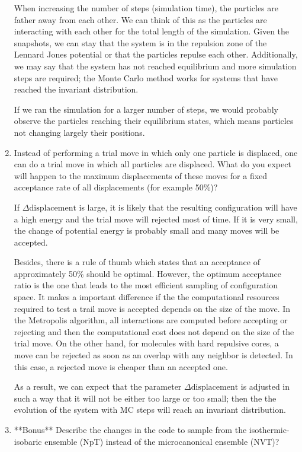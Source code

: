 \documentclass[12pt,letterpaper]{report}
\begin{document}
\begin{enumerate}
  	When increasing the number of steps (simulation time), the particles are father away from each other. 
  	We can think of this as the particles are interacting with each other for the total length of the simulation. Given the snapshots, we can stay that the system is in the repulsion zone of the Lennard Jones potential or that the particles repulse each other. Additionally, we may say that the system has not reached equilibrium and more simulation steps are required; the Monte Carlo method works for systems that have reached the invariant distribution. 
  	
  	If we ran the simulation for a larger number of steps, we would probably observe the particles reaching their equilibrium states, which means particles not changing largely their positions.
  	
	\item
	Instead of performing a trial move in which only one particle is displaced, one can do a trial move in which all particles are displaced. What do you expect will happen to the maximum displacements of these moves for a fixed acceptance rate of all displacements (for example 50\%)?
	
	If $\Delta \text{displacement}$ is large, it is likely that the resulting configuration will have a high energy and the trial move will rejected most of time. If it is very small, the change of potential energy is probably small and many moves will be accepted. 
	
	Besides, there is a rule of thumb which states that an acceptance of approximately 50\% should be optimal. However, the optimum acceptance ratio is the one that leads to the most efficient sampling of configuration space. It makes a important difference if the the computational resources required to test a trail move is accepted depends on the size of the move. In the Metropolis algorithm, all interactions are computed before accepting or rejecting and then the computational cost does not depend on the size of the trial move. On the other hand, for molecules with hard repulsive cores, a move can be rejected as soon as an overlap with any neighbor is detected. In this case, a rejected move is cheaper than an accepted one.
	
	As a result, we can expect that the parameter $\Delta \text{displacement}$ is adjusted in such a way that it will not be either too large or too small; then the the evolution of the system with MC steps will reach an invariant distribution.
	
	\item 
  	**Bonus** Describe the changes in the code to sample from the isothermic-isobaric ensemble (NpT) instead of the microcanonical ensemble (NVT)?
  	

\end{enumerate}
\end{document}
